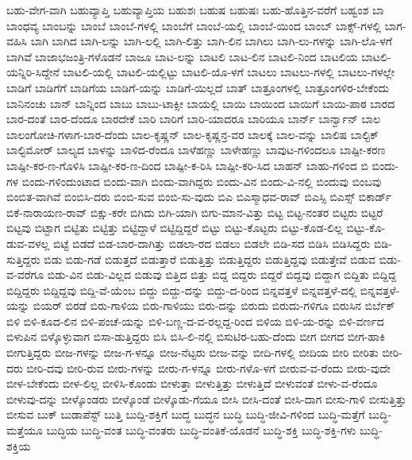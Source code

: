 {ಬಹು-ವೇಗ-ವಾಗಿ
ಬಹುವ್ಯಾಪ್ತಿ
ಬಹುವ್ಯಾಪ್ತಿಯ
ಬಹುಶಃ
ಬಹುಷ
ಬಹುಷಃ
ಬಹು-ಹೊತ್ತಿನ-ವರೆಗೆ
ಬಹ್ವಂಶ
ಬಾ
ಬಾಂಧವ್ಯ
ಬಾಂಬನ್ನು
ಬಾಂಬೆ
ಬಾಂಬೆ-ಗಳಲ್ಲಿ
ಬಾಂಬೆಗೆ
ಬಾಂಬೆ-ಯಲ್ಲಿ
ಬಾಂಬೆ-ಯಿಂದ
ಬಾಂಬ್
ಬಾಕ್ಸ್-ಗಳಲ್ಲಿ
ಬಾಗ-ವಹಿಸಿ
ಬಾಗಿ
ಬಾಗಿದ
ಬಾಗಿ-ಲನ್ನು
ಬಾಗಿ-ಲಲ್ಲಿ
ಬಾಗಿ-ಲಿತ್ತು
ಬಾಗಿ-ಲಿನ
ಬಾಗಿಲು
ಬಾಗಿ-ಲು-ಗಳನ್ನು
ಬಾಗಿ-ಲೊ-ಳಗೆ
ಬಾಗಿವೆ
ಬಾಜಾಭಜಂತ್ರಿ-ಗಳೊಡನೆ
ಬಾಜೂ
ಬಾಟ-ಲನ್ನು
ಬಾಟಲಿ
ಬಾಟ-ಲಿನ
ಬಾಟಲಿ-ನಿಂದ
ಬಾಟಲಿಯ
ಬಾಟಲಿ-ಯನ್ನಿರಿ-ಸಿದ್ದೇನೆ
ಬಾಟಲಿ-ಯಲ್ಲಿ
ಬಾಟಲಿ-ಯಲ್ಲಿಟ್ಟು
ಬಾಟಲಿ-ಯೊ-ಳಗೆ
ಬಾಟಲು
ಬಾಟಲು-ಗಳಲ್ಲಿ
ಬಾಟಲು-ಗಳಲ್ಲೇ
ಬಾಡಿಗೆ
ಬಾಡಿಗೆಗೆ
ಬಾಡಿಗೆಯ
ಬಾಡಿಗೆ-ಯನ್ನು
ಬಾಡಿಗೆ-ಯಿಲ್ಲದೆ
ಬಾತ್
ಬಾತ್ರೂಂಗಳಲ್ಲಿ
ಬಾತ್ರೂಂಗಳಿರ-ಬೇಕೆಂದು
ಬಾನಿನಂಚು
ಬಾನ್
ಬಾನ್ನಿಂದ
ಬಾಬು
ಬಾಬು-ಟಾಕ್ಸೀ
ಬಾಯಲ್ಲಿ
ಬಾಯಿ
ಬಾಯಿಂದ
ಬಾಯಿಗೆ
ಬಾಯಿ-ಪಾಠ
ಬಾರದ
ಬಾರ-ದಂತೆ
ಬಾರ-ದೆಂದೂ
ಬಾರದೇಕೆ
ಬಾರಿ
ಬಾರಿಗೆ
ಬಾರಿ-ಯಾದರೂ
ಬಾರಿಯೂ
ಬಾರ್ನ್
ಬಾರ್ನ್ವಾನ್
ಬಾಲ
ಬಾಲಂಗೋಚಿ-ಗಳಾಗ-ಬಾರ-ದೆಂದು
ಬಾಲ-ಕೃಷ್ಣನ್
ಬಾಲ-ಕೃಷ್ಣನ್ರ-ವರ
ಬಾಲಕ್ಕೆ
ಬಾಲ-ವನ್ನು
ಬಾಲಿಷ
ಬಾಲ್ಟಿಕ್
ಬಾಲ್ಟಿಮೋರ್
ಬಾಲ್ಯದ
ಬಾಳನ್ನು
ಬಾಳಿದ-ರೆಂದೂ
ಬಾಳೆಹಣ್ಣು
ಬಾಳೇಹಣ್ಣು
ಬಾವುಟ-ಗಳಿಂದಲೂ
ಬಾಷ್ಪೀ-ಕರಣ
ಬಾಷ್ಪೀ-ಕರ-ಣ-ಗೊಳಿಸಿ
ಬಾಷ್ಪೀ-ಕರ-ಣ-ದಿಂದ
ಬಾಷ್ಪೀ-ಕ-ರಿಸಿ
ಬಾಷ್ಪೀ-ಕರಿ-ಸಿದ
ಬಾಹನ್
ಬಾಹು-ಗಳಿಂದ
ಬಿ
ಬಿಂದು-ಗಳ
ಬಿಂದು-ಗಳಿಂದುಂಟಾದ
ಬಿಂದು-ವಾಗಿ
ಬಿಂದು-ವಾಗಿದ್ದರು
ಬಿಂದು-ವಿನ
ಬಿಂದು-ವಿ-ನಲ್ಲಿ
ಬಿಂದುವು
ಬಿಂಬವು
ಬಿಂಬಿತ-ವಾಗಿವೆ
ಬಿಂಬಿಸಿ-ದರು
ಬಿಂಬಿ-ಸುವ
ಬಿಂಬಿ-ಸು-ವುದು
ಬಿಎ
ಬಿಎಸ್ಮಾಧವ-ರಾವ್
ಬಿಎಸ್ಸಿ
ಬಿಎಸ್ಸ್
ಬಿಕಾರ್ಡ್
ಬಿಕೆ-ನಾರಾಯಣ-ರಾವ್
ಬಿಕ್ಷು-ಕರೇ
ಬಿಗಿದು
ಬಿಗಿ-ಯಾಗಿ
ಬಿಗು-ಮಾನ-ವಿತ್ತು
ಬಿಟ್ಟ
ಬಿಟ್ಟ-ನಂತರ
ಬಿಟ್ಟರು
ಬಿಟ್ಟರೆ
ಬಿಟ್ಟವು
ಬಿಟ್ಟಾಗ
ಬಿಟ್ಟಿತು
ಬಿಟ್ಟಿತ್ತು
ಬಿಟ್ಟಿದ್ದಾಳೆ
ಬಿಟ್ಟಿದ್ದಿದ್ದರೆ
ಬಿಟ್ಟು
ಬಿಟ್ಟು-ಕೊಟ್ಟರು
ಬಿಟ್ಟು-ಕೊಡ-ಲಿಲ್ಲ
ಬಿಟ್ಟು-ಕೊ-ಡುವ-ವಳಲ್ಲ
ಬಿಟ್ಟೆ
ಬಿಡದೆ
ಬಿಡ-ಬಾರ-ದಾಗಿತ್ತು
ಬಿಡಲಾ-ರದ
ಬಿಡಲು
ಬಿಡಲೇ
ಬಿಡಿ-ಸದ
ಬಿಡಿಸಿ
ಬಿಡಿಸಿದ್ದರು
ಬಿಡಿ-ಸುತ್ತಿದ್ದರು
ಬಿಡು
ಬಿಡು-ಗಡೆ
ಬಿಡುತ್ತದೆ
ಬಿಡುತ್ತಾರೆ
ಬಿಡುತ್ತಿತ್ತು
ಬಿಡುತ್ತಿದ್ದರು
ಬಿಡುತ್ತಿದ್ದವು
ಬಿಡುತ್ತೇವೆ
ಬಿಡುವ
ಬಿಡು-ವ-ವರೆಗೂ
ಬಿಡು-ವಿನ
ಬಿಡು-ವಿಲ್ಲದ
ಬಿಡುವು
ಬಿತ್ತಿದ
ಬಿತ್ತು
ಬಿದ್ದ
ಬಿದ್ದರು
ಬಿದ್ದರೆ
ಬಿದ್ದವು
ಬಿದ್ದಾಗ
ಬಿದ್ದಿತು
ಬಿದ್ದಿದ್ದ
ಬಿದ್ದಿದ್ದರು
ಬಿದ್ದಿದ್ದವು
ಬಿದ್ದಿ-ವೆ-ಯೆಂಬ
ಬಿದ್ದು
ಬಿದ್ದು-ದನ್ನು
ಬಿದ್ದು-ದ-ರಿಂದ
ಬಿನ್ನವತ್ತಳೆ
ಬಿನ್ನವತ್ತಳೆ-ದಲ್ಲಿ
ಬಿನ್ನವತ್ತಳೆ-ಯನ್ನು
ಬಿಯರ್
ಬಿರಡೆ
ಬಿರು-ಗಾಳಿಯ
ಬಿರು-ಗಾಳಿಯು
ಬಿರು-ದನ್ನು
ಬಿರುದು
ಬಿರುದು-ಗಳಿಗೂ
ಬಿರುಸಿನ
ಬಿರ್ಬೆಕ್
ಬಿಳಿ
ಬಿಳಿ-ಕೂದ-ಲಿನ
ಬಿಳಿ-ಪಂಚೆ-ಯನ್ನು
ಬಿಳಿ-ಬಣ್ಣ-ದ-ವ-ರಲ್ಲದ್ದ-ರಿಂದ
ಬಿಳಿಯ
ಬಿಳಿ-ಯ-ರನ್ನು
ಬಿಳಿ-ವರ್ಣದ
ಬಿಳುಪಿನ
ಬಿಳ್ಕೊಳ್ಳುವಾಗ
ಬಿಸಾ-ಡುತ್ತಿದ್ದರು
ಬಿಸಿ
ಬಿಸಿ-ಲಿ-ನಲ್ಲಿ
ಬಿಸುಟಿರ-ಬಹು-ದೆಂದು
ಬೀಗ
ಬೀಗದ
ಬೀಗ-ಹಾಕಿ
ಬೀಗುತ್ತಿದ್ದರು
ಬೀಜ-ಗಳನ್ನು
ಬೀಜ-ಗ-ಳನ್ನೂ
ಬೀಜ-ನೆಟ್ಟರು
ಬೀಜ-ವನ್ನು
ಬೀದಿ-ಗಳಲ್ಲಿ
ಬೀದಿಯ
ಬೀರಿ
ಬೀರಿತು
ಬೀರಿ-ದರು
ಬೀರಿ-ದವು
ಬೀರಿ-ರುವ
ಬೀರು-ಗಳನ್ನು
ಬೀರು-ಗ-ಳನ್ನೂ
ಬೀರು-ಗಳೊ-ಳಗೆ
ಬೀರುವ-ವ-ರೆಂದು
ಬೀರು-ವುದೇ
ಬೀಳ-ಬೇಕೆಂದು
ಬೀಳ-ಲಿಲ್ಲ
ಬೀಳಿಸಿ-ಕೊಂಡು
ಬೀಳುತ್ತಾ
ಬೀಳುತ್ತಿತ್ತು
ಬೀಳುತ್ತಿದೆ
ಬೀಳುವಂತೆ
ಬೀಳು-ವ-ರೆಂದೂ
ಬೀಳುವು-ದನ್ನು
ಬೀಳ್ಕೊಂಡರು
ಬೀಳ್ಕೊಂಡೆ
ಬೀಳ್ಕೊಡು-ಗೆಯೂ
ಬೀಸಿ
ಬೀಸಿ-ದಂತೆ
ಬೀಸಿ-ದಾಗ
ಬೀಸು-ಗಾಳಿ
ಬೀಸುತ್ತಿತ್ತು
ಬೀಸುವ
ಬುಕ್
ಬುಡಾಪೆಸ್ಟ್
ಬುತ್ತಿ
ಬುದ್ದಿ-ಶಕ್ತಿಗೆ
ಬುದ್ಧ
ಬುದ್ಧನ
ಬುದ್ಧಿ
ಬುದ್ಧಿ-ಜೀವಿ-ಗಳಿಂದ
ಬುದ್ಧಿ-ಮತ್ತೆಗೆ
ಬುದ್ಧಿ-ಮತ್ತೆಯೂ
ಬುದ್ಧಿಯ
ಬುದ್ಧಿ-ವಂತ
ಬುದ್ಧಿ-ವಂತರು
ಬುದ್ಧಿ-ವಂತಿಕೆ-ಯೊಡನೆ
ಬುದ್ಧಿ-ಶಕ್ತಿ
ಬುದ್ಧಿ-ಶಕ್ತಿ-ಗಳು
ಬುದ್ಧಿ-ಶಕ್ತಿಯ
}
